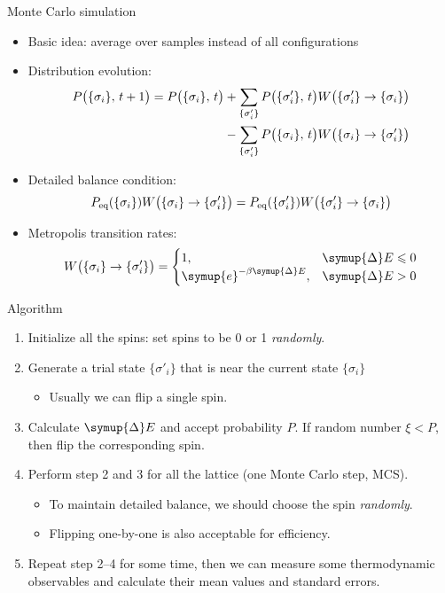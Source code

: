 \documentclass[aspectratio=169]{beamer}
\def\ee{{\symup{e}}}
\def\incr{{\symup{\Delta}}}
\def\q#1{{\{#1\}}}
\begin{document}
\begin{frame}{Monte Carlo simulation}
\begin{itemize}
  \item Basic idea: average over samples instead of all configurations
  \item Distribution evolution:
    \begin{align*}
      P\qty\big(\q{\sigma_i},\,t+1) = P\qty\big(\q{\sigma_i},\,t)
      &+ \sum_{\q{\sigma'_i}} P\qty\big(\q{\sigma'_i},\,t) W\qty\big(\q{\sigma'_i}\to\q{\sigma_i})
         \notag \\
      &- \sum_{\q{\sigma'_i}} P\qty\big(\q{\sigma_i},\,t)  W\qty\big(\q{\sigma_i}\to\q{\sigma'_i})
    \end{align*}
  \item Detailed balance condition:
    \[
        P_{\text{eq}}(\q{\sigma_i})  W\qty\big(\q{\sigma_i}\to\q{\sigma'_i})
      = P_{\text{eq}}(\q{\sigma'_i}) W\qty\big(\q{\sigma'_i}\to\q{\sigma_i})
    \]
  \item Metropolis transition rates:
    \[
      W\qty\big(\q{\sigma_i}\to\q{\sigma'_i}) =
      \begin{cases}
        1, & \incr{E} \leqslant 0 \\
        \ee^{-\beta \incr{E}}, & \incr{E} > 0
      \end{cases}
    \]
\end{itemize}
\end{frame}

\begin{frame}{Algorithm}
\begin{enumerate}
  \item Initialize all the spins: set spins to be 0 or 1 \emph{randomly}.
  \item Generate a trial state $\q{\sigma'_i}$ that is near the current state $\q{\sigma_i}$
    \begin{itemize}
      \item Usually we can flip a single spin.
    \end{itemize}
  \item Calculate $\incr{E}$ and accept probability $P$. If random number $\xi<P$, then flip the
    corresponding spin.
  \item Perform step 2 and 3 for all the lattice (one Monte Carlo step, MCS).
    \begin{itemize}
      \item To maintain detailed balance, we should choose the spin \emph{randomly}.
      \item Flipping one-by-one is also acceptable for efficiency.
    \end{itemize}
  \item Repeat step 2--4 for some time, then we can measure some thermodynamic observables and
    calculate their mean values and standard errors.
\end{enumerate}
\end{frame}
\end{document}
